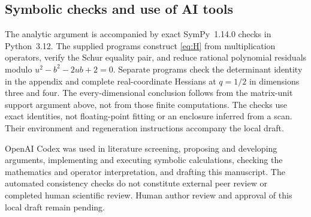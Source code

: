 \documentclass[11pt,a4paper]{article}
\begin{document}
\subsection{Symbolic checks and use of AI tools}
The analytic argument is accompanied by exact SymPy~1.14.0
checks in Python~3.12. The supplied programs construct
\eqref{eq:H} from multiplication operators, verify the
Schur equality pair, and reduce rational polynomial
residuals modulo \(u^2-b^2-2ub+2=0\).
Separate programs check the determinant identity in the
appendix and complete real-coordinate Hessians at
\(q=1/2\) in dimensions three and four.
The every-dimensional conclusion follows from the
matrix-unit support argument above, not from those finite
computations. The checks use exact identities, not
floating-point fitting or an enclosure inferred from a scan.
Their environment and regeneration instructions accompany
the local draft.

OpenAI Codex was used in literature screening, proposing
and developing arguments, implementing and executing
symbolic calculations, checking the mathematics and
operator interpretation, and drafting this manuscript.
The automated consistency checks do not constitute
external peer review or completed human scientific review.
Human author review and approval of this local draft remain pending.

\appendix
\end{document}
